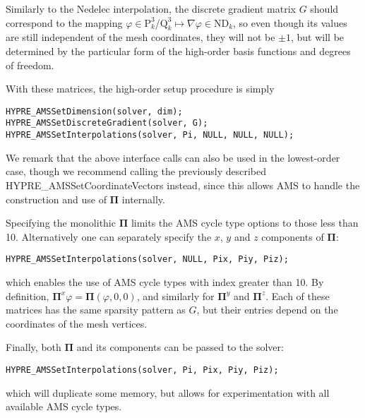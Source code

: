 Similarly to the Nedelec interpolation, the discrete gradient matrix $G$ should
correspond to the mapping $\varphi \in \mathrm{P}_k^3$/$\mathrm{Q}_k^3 \mapsto
\nabla \varphi \in \mathrm{ND}_k$, so even though its values are still
independent of the mesh coordinates, they will not be $\pm 1$, but will be
determined by the particular form of the high-order basis functions and degrees
of freedom.

With these matrices, the high-order setup procedure is simply
\begin{display}\begin{verbatim}
HYPRE_AMSSetDimension(solver, dim);
HYPRE_AMSSetDiscreteGradient(solver, G);
HYPRE_AMSSetInterpolations(solver, Pi, NULL, NULL, NULL);
\end{verbatim}\end{display}
We remark that the above interface calls can also be used in the lowest-order
case, though we recommend calling the previously described
HYPRE\_AMSSetCoordinateVectors instead, since this allows AMS to handle the
construction and use of ${\mathbf \Pi}$ internally.


Specifying the monolithic ${\mathbf \Pi}$ limits the AMS cycle type options to
those less than 10. Alternatively one can separately specify the $x$, $y$ and
$z$ components of $\mathbf \Pi$:
\begin{display}\begin{verbatim}
HYPRE_AMSSetInterpolations(solver, NULL, Pix, Piy, Piz);
\end{verbatim}\end{display}
which enables the use of AMS cycle types with index greater than 10. By
definition, ${\mathbf \Pi}^x \varphi = {\mathbf \Pi} (\varphi,0,0)$, and
similarly for ${\mathbf \Pi}^y$ and ${\mathbf \Pi}^z$. Each of these matrices
has the same sparsity pattern as $G$, but their entries depend on the
coordinates of the mesh vertices.

Finally, both ${\mathbf \Pi}$ and its components can be passed to the solver:
\begin{display}\begin{verbatim}
HYPRE_AMSSetInterpolations(solver, Pi, Pix, Piy, Piz);
\end{verbatim}\end{display}
which will duplicate some memory, but allows for experimentation with all
available AMS cycle types.



